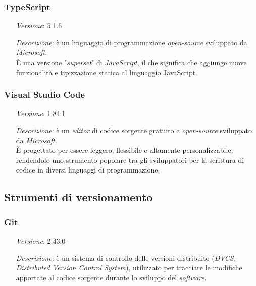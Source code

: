     \subsubsection*{TypeScript}
    \begin{itemize}
        \item [\textit{Versione}:] 5.1.6
        \item [\textit{Descrizione}:] è un linguaggio di programmazione \textit{open-source} sviluppato da \textit{Microsoft}. \\
                È una versione "\textit{superset}" di \textit{JavaScript}, il che significa che aggiunge nuove funzionalità e tipizzazione statica al linguaggio JavaScript.
    \end{itemize}

    \subsubsection*{Visual Studio Code}
    \begin{itemize}
        \item [\textit{Versione}:] 1.84.1
        \item [\textit{Descrizione}:] è un \textit{editor} di codice sorgente gratuito e \textit{open-source} sviluppato da \textit{Microsoft}. \\
                È progettato per essere leggero, flessibile e altamente personalizzabile, rendendolo uno strumento popolare tra gli sviluppatori per la scrittura di codice in diversi linguaggi di programmazione.
    \end{itemize}


\subsection{Strumenti di versionamento}
    \subsubsection*{Git}
    \begin{itemize}
        \item [\textit{Versione}:] 2.43.0
        \item [\textit{Descrizione}:] è un sistema di controllo delle versioni distribuito (\textit{DVCS, Distributed Version Control System}), utilizzato per tracciare le modifiche apportate al codice sorgente durante lo sviluppo del \textit{software}.
    \end{itemize}

